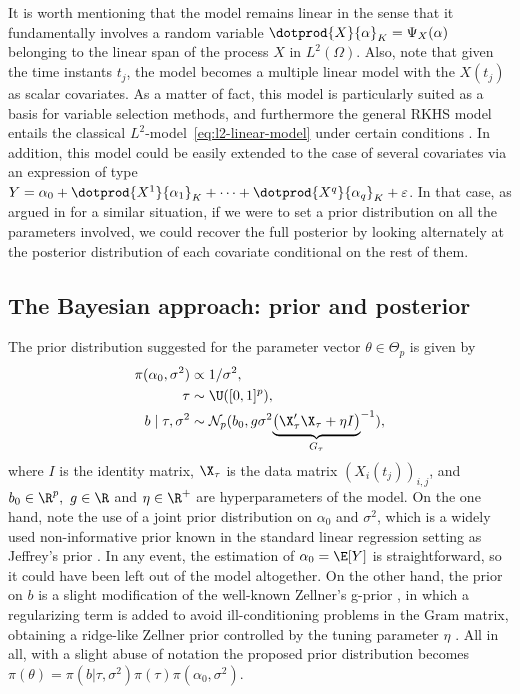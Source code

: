 It is worth mentioning that the model remains linear in the sense that it fundamentally involves a random variable \(\dotprod{X}{\alpha}_K = \Psi_X(\alpha)\) belonging to the linear span of the process \(X\) in \(L^2(\Omega)\). Also, note that given the time instants \(t_j\), the model becomes a multiple linear model with the \(X(t_j)\) as scalar covariates. As a matter of fact, this model is particularly suited as a basis for variable selection methods, and furthermore the general RKHS model entails the classical \(L^2\)-model~\eqref{eq:l2-linear-model} under certain conditions \citep[see][Sec.~3]{berrendero2020general}. In addition, this model could be easily extended to the case of several covariates via an expression of type \(Y=\alpha_0 + \dotprod{X^1}{\alpha_1}_K + \cdots + \dotprod{X^q}{\alpha_q}_K + \epsilon\). In that case, as argued in \citet{grollemund2019bayesian} for a similar situation, if we were to set a prior distribution on all the parameters involved, we could recover the full posterior by looking alternately at the posterior distribution of each covariate conditional on the rest of them.

\enlargethispage{1\baselineskip}

\subsection*{The Bayesian approach: prior and posterior}

The prior distribution suggested for the parameter vector \(\theta \in \Theta_p\) is given by
\begin{align}\label{eq:prior-linear}
  \begin{split}
  \pi(\alpha_0, \sigma^2)              & \propto 1/\sigma^2,                                                     \\
  \tau                     & \sim \U([0, 1]^p),                                              \\
  b\mid \tau, \sigma^2 & \sim \mathcal N_p(b_0, g\sigma^2{\underbrace{\left(\X_\tau' \X_\tau + \eta I\right)}_{G_\tau}}^{-1}),
\end{split}
\end{align}
where \(I\) is the identity matrix, \(\X_\tau\) is the data matrix \((X_i(t_j))_{i,j}\), and \(b_0\in \R^p, \ g \in \R\) and \(\eta \in \R^+\) are hyperparameters of the model. On the one hand, note the use of a joint prior distribution on \(\alpha_0\) and \(\sigma^2\), which is a widely used non-informative prior known in the standard linear regression setting as Jeffrey's prior \citep{jeffreys1946invariant}. In any event, the estimation of \(\alpha_0=\E[Y]\) is straightforward, so it could have been left out of the model altogether. On the other hand, the prior on \(b\) is a slight modification of the well-known Zellner's g-prior \citep{zellner1986assessing}, in which a regularizing term is added to avoid ill-conditioning problems in the Gram matrix, obtaining a ridge-like Zellner prior controlled by the tuning parameter \(\eta\) \citep{baragatti2012study}. All in all, with a slight abuse of notation the proposed prior distribution becomes \(\pi(\theta) = \pi(b| \tau, \sigma^2)\pi(\tau)\pi(\alpha_0, \sigma^2)\).

